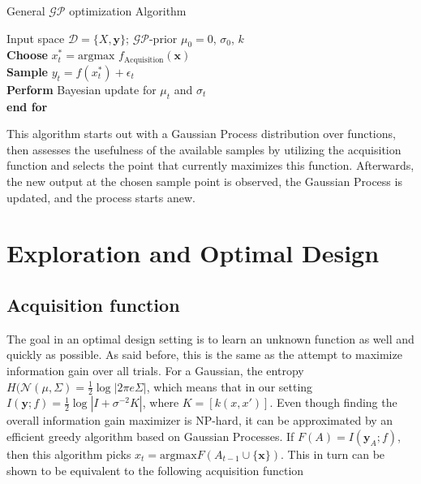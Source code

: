 \documentclass[authoryear,11pt,review]{elsarticle}
\begin{document}
\begin{algorithm}
\caption{General $\mathcal{GP}$ optimization Algorithm}
\label{alg:general}
\begin{algorithmic}
\Require Input space $\mathcal{D}=\{X,\mathbf{y}\}$; $\mathcal{GP}$-prior $\mu_0=0$, $\sigma_0$, $k$
\\
 \hspace{5mm}\textbf{Choose} $x^*_{ t}=\text{argmax } f_{\text{Acquisition}}(\textbf{x})$\\
\hspace{5mm}\textbf{Sample} $y_t=f(x^*_{ t})+\epsilon_t$\\
\hspace{5mm}\textbf{Perform} Bayesian update for $\mu_t$ and $\sigma_t$\\
\textbf{end for}
\EndFor
\end{algorithmic}
\end{algorithm}

This algorithm starts out with a Gaussian Process distribution over functions, then assesses the usefulness of the available samples by utilizing the acquisition function and selects the point that currently maximizes this function. Afterwards, the new output at the chosen sample point is observed, the Gaussian Process is updated, and the process starts anew. 

\section{Exploration and Optimal Design}
\subsection{Acquisition function}
The goal in an optimal design setting is to learn an unknown function as well and quickly as possible. As said before, this is the same as the attempt to maximize information gain over all trials. For a Gaussian, the entropy $H(\mathcal{N}(\mu, \Sigma) = \frac{1}{2} \log  |2\pi e\Sigma|$, which means that in our setting $I(\mathbf{y};f)=\frac{1}{2}\log |I+ \sigma^{-2}K|$, where $K=[k(x,x')]$. Even though finding the overall information gain maximizer is NP-hard, it can be approximated by an efficient greedy algorithm based on Gaussian Processes. If $F(A)=I(\mathbf{y}_A;f)$, then this algorithm picks $x_t= \text{argmax} F(A_{t-1} \cup \{\mathbf{x}\})$. This in turn can be shown to be equivalent to the following acquisition function
\end{document}
